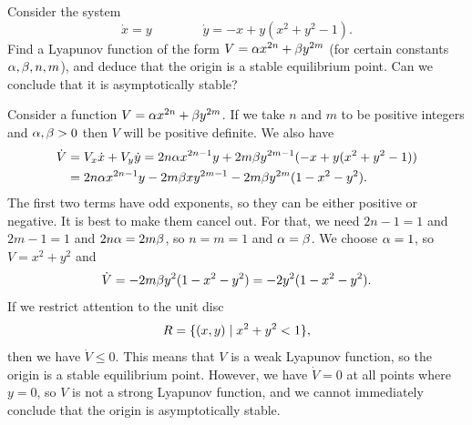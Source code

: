 \documentclass[a4paper]{amsart}
\begin{document}
\begin{exercise}\label{ex-lyapunov-c}
 Consider the system 
 \[ \dot{x} = y \hspace{4em} \dot{y} = -x + y(x^2+y^2-1). \]
 Find a Lyapunov function of the form $V=\alpha x^{2n}+\beta y^{2m}$ (for
 certain constants $\alpha,\beta,n,m$), and deduce that the origin is a
 stable equilibrium point.  Can we conclude that it is asymptotically
 stable? 
\end{exercise}
\begin{solution}
 Consider a function $V=\alpha x^{2n}+\beta y^{2m}$.  If we take $n$ and
 $m$ to be positive integers and $\alpha,\beta>0$ then $V$ will be positive
 definite.  We also have
 \begin{align*}
  \dot{V} &= V_x\dot{x} + V_y\dot{y} 
           = 2n\alpha x^{2n-1}y + 
             2m\beta y^{2m-1}(-x + y(x^2+y^2-1)) \\
   &= 2n\alpha x^{2n-1}y - 2m\beta xy^{2m-1} - 2m\beta y^{2m}(1-x^2-y^2).
 \end{align*} 
 The first two terms have odd exponents, so they can be either
 positive or negative.  It is best to make them cancel out.  For that,
 we need $2n-1=1$ and $2m-1=1$ and $2n\alpha=2m\beta$, so $n=m=1$ and
 $\alpha=\beta$.  We choose $\alpha=1$, so $V=x^2+y^2$ and 
 \[ \dot{V} = -2m\beta y^2(1-x^2-y^2) = -2y^2(1-x^2-y^2). \]
 If we restrict attention to the unit disc
 \[ R = \{(x,y)\;|\; x^2+y^2 < 1\}, \]
 then we have $\dot{V}\leq 0$.  This means that $V$ is a weak Lyapunov
 function, so the origin is a stable equilibrium point.  However, we
 have $\dot{V}=0$ at all points where $y=0$, so $V$ is not a strong
 Lyapunov function, and we cannot immediately conclude that the origin
 is asymptotically stable.
\end{solution}
\end{document}

